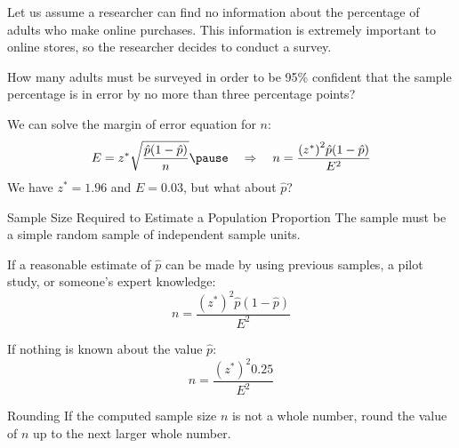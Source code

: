 \documentclass{beamer}
\begin{document}
\begin{frame}
  \begin{example}\label{ex:online}
    \vspace{-2mm} %
    Let us assume a researcher can find no information about the percentage of adults who make online purchases. This information is extremely important to online stores, so the researcher decides to conduct a survey.\pause

    \vspace{1mm}
    How many adults must be surveyed in order to be 95\% confident that the sample percentage is in error by no more than three percentage points?\pause

    \vspace{1mm}
    We can solve the margin of error equation for $n$:
    \begin{equation*}
      E=z^{*}\sqrt{\dfrac{\hat{p}(1-\hat{p})}{n}} \pause
      \quad\Rightarrow\quad
      n=\dfrac{ {(z^{*})}^2 \hat{p} (1-\hat{p}) }{E^2}
    \end{equation*}\pause
    We have $z^{*}=1.96$ and $E=0.03$, but what about $\hat{p}$?
  \end{example}
\end{frame}

\begin{frame}
  \begin{block}{Sample Size Required to Estimate a Population Proportion}
    The sample must be a simple random sample of independent sample units.\pause

    \vspace{2mm}
    If a reasonable estimate of $\hat{p}$ can be made by using previous samples, a pilot study, or someone's expert knowledge:
    \begin{equation*}
      n=\dfrac{ {(z^{*})}^2 \hat{p} (1-\hat{p}) }{E^2}
    \end{equation*}\pause

    \vspace{-3mm}
    If nothing is known about the value $\hat{p}$:
    \begin{equation*}
      n=\dfrac{ {(z^{*})}^2 0.25 }{E^2}
    \end{equation*}
  \end{block}\pause

  \begin{block}{Rounding}
    If the computed sample size $n$ is not a whole number, round the value of $n$ up to the next larger whole number.
  \end{block}
\end{frame}
\end{document}
